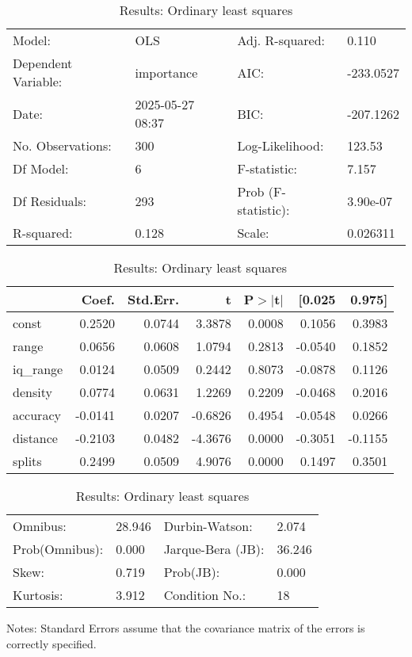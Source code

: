 \begin{table}
\caption{Results: Ordinary least squares}
\label{}
\begin{center}
\begin{tabular}{llll}
\hline
Model:              & OLS              & Adj. R-squared:     & 0.110      \\
Dependent Variable: & importance       & AIC:                & -233.0527  \\
Date:               & 2025-05-27 08:37 & BIC:                & -207.1262  \\
No. Observations:   & 300              & Log-Likelihood:     & 123.53     \\
Df Model:           & 6                & F-statistic:        & 7.157      \\
Df Residuals:       & 293              & Prob (F-statistic): & 3.90e-07   \\
R-squared:          & 0.128            & Scale:              & 0.026311   \\
\hline
\end{tabular}
\end{center}

\begin{center}
\begin{tabular}{lrrrrrr}
\hline
          &   Coef. & Std.Err. &       t & P$> |$t$|$ &  [0.025 &  0.975]  \\
\hline
const     &  0.2520 &   0.0744 &  3.3878 &      0.0008 &  0.1056 &  0.3983  \\
range     &  0.0656 &   0.0608 &  1.0794 &      0.2813 & -0.0540 &  0.1852  \\
iq\_range &  0.0124 &   0.0509 &  0.2442 &      0.8073 & -0.0878 &  0.1126  \\
density   &  0.0774 &   0.0631 &  1.2269 &      0.2209 & -0.0468 &  0.2016  \\
accuracy  & -0.0141 &   0.0207 & -0.6826 &      0.4954 & -0.0548 &  0.0266  \\
distance  & -0.2103 &   0.0482 & -4.3676 &      0.0000 & -0.3051 & -0.1155  \\
splits    &  0.2499 &   0.0509 &  4.9076 &      0.0000 &  0.1497 &  0.3501  \\
\hline
\end{tabular}
\end{center}

\begin{center}
\begin{tabular}{llll}
\hline
Omnibus:       & 28.946 & Durbin-Watson:    & 2.074   \\
Prob(Omnibus): & 0.000  & Jarque-Bera (JB): & 36.246  \\
Skew:          & 0.719  & Prob(JB):         & 0.000   \\
Kurtosis:      & 3.912  & Condition No.:    & 18      \\
\hline
\end{tabular}
\end{center}
\end{table}
\bigskip
Notes: \newline 
[1] Standard Errors assume that the covariance matrix of the errors is correctly specified.